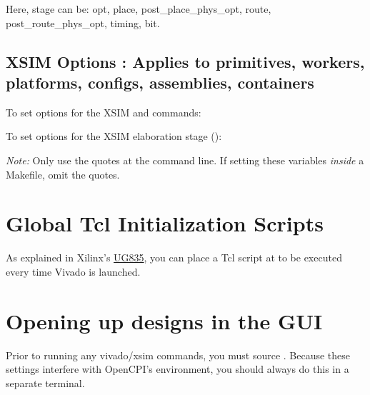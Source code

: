 \begin{flushleft}
Here, stage can be: opt, place, post\_place\_phys\_opt, route, post\_route\_phys\_opt, timing, bit.\newline


\subsection{XSIM Options : Applies to primitives, workers, platforms, configs, assemblies, containers}
To set options for the XSIM  and  commands:\newline
{}\newline

To set options for the XSIM elaboration stage ():\newline
{}\newline
{\footnotesize \textit{Note:} Only use the quotes at the command line. If setting these variables \textit{inside} a Makefile, omit the quotes.\par}
\section{Global Tcl Initialization Scripts}
As explained in Xilinx's \href{https://www.xilinx.com/support/documentation/sw_manuals/xilinx2017_1/ug835-vivado-tcl-commands.pdf}{UG835}, you can place a Tcl script at  to be executed every time Vivado is launched.

\section{Opening up designs in the GUI}
Prior to running any vivado/xsim commands, you must source . Because these settings interfere with OpenCPI's environment, you should always do this in a separate terminal.

\end{flushleft}
